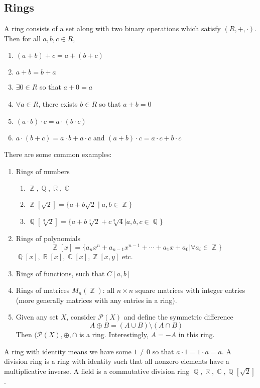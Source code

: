 \documentclass[12pt, a4paper]{book}
\DeclareMathOperator{\Q}{\mathbb{Q}}
\DeclareMathOperator{\Z}{\mathbb{Z}}
\DeclareMathOperator{\R}{\mathbb{R}}
\DeclareMathOperator{\C}{\mathbb{C}}
\theoremstyle{nonumberplain}
\begin{document}
\subsection{Rings}
A ring consists of a set along with two binary operations which satisfy $(R,+,\cdot)$.
Then for all $a,b,c\in R$,
\begin{enumerate}[nolistsep]
    \item $(a+b)+c=a+(b+c)$
    \item $a+b=b+a$
    \item $\exists 0\in R$ so that $a+0=a$
    \item $\forall a\in R$, there exists $b\in R$ so that $a+b=0$
    \item $(a\cdot b)\cdot c=a\cdot(b\cdot c)$
    \item $a\cdot(b+c)=a\cdot b+a\cdot c$ and $(a+b)\cdot c=a\cdot c+b\cdot c$
\end{enumerate}
There are some common examples:
\begin{enumerate}
    \item Rings of numbers
        \begin{enumerate}
            \item $\Z,\Q,\R,\C$
            \item $\Z[\sqrt{2}]=\{a+b\sqrt{2}\mid a,b\in\Z\}$ 
            \item $\Q[\sqrt[3]{2}]=\{a+b\sqrt[3]{2}+c\sqrt[3]{4}|a,b,c\in\Q\}$
        \end{enumerate}
    \item Rings of polynomials
        \[\Z[x]=\{a_nx^n+a_{n-1}x^{n-1}+\cdots+a_1x+a_0|\forall a_i\in \Z\}\]
        $\Q[x],\R[x],\C[x],\Z[x,y]$ etc.
    \item Rings of functions, such that $C[a,b]$
    \item Rings of matrices $M_n(\Z)$: all $n\times n$ square matrices with integer entries (more generally matrices with any entries in a ring).
    \item Given any set $X$, consider $\mathcal{P}(X)$ and define the symmetric difference
        \[A\oplus B=(A\cup B)\setminus(A\cap B)\]
        Then $(\mathcal{P}(X),\oplus,\cap$ is a ring.
        Interestingly, $A=-A$ in this ring.
\end{enumerate}
A ring with identity means we have some $1\neq 0$ so that $a\cdot 1=1\cdot a=a$.
A division ring is a ring with identity such that all nonzero elements have a multiplicative inverse.
A field is a commutative division ring $\Q,\R,\C,\Q[\sqrt{2}]$.
\end{document}
